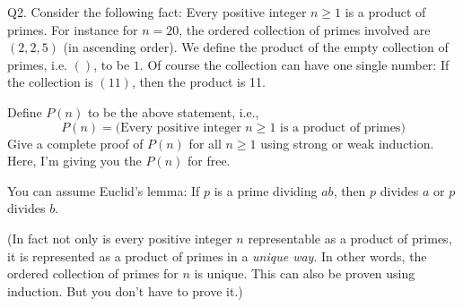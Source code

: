 Q2.
Consider the following fact:
Every positive integer $n \geq 1$ is a product of primes.
For instance for $n = 20$,
the ordered collection of primes involved are $(2, 2, 5)$ (in ascending order).
We define the product of the empty collection of primes, i.e. $()$, to be $1$.
Of course the collection can have one single number:
If the collection is $(11)$, then the product is 11.

Define $P(n)$ to be the above statement, i.e.,
\[
  P(n) =
  \biggl(
  \text{Every positive integer $n \geq 1$ is a product of primes}
  \biggr)
\]
Give a complete proof of $P(n)$ for all $n \geq 1$
using strong or weak induction.
Here, I'm giving you the $P(n)$ for free.

You can assume Euclid's lemma: If $p$ is a prime dividing $ab$,
then $p$ divides $a$ or $p$ divides $b$.

(In fact not only is every positive integer $n$ representable
as a product of primes,
it is represented as a product of primes in a \textit{unique way}.
In other words, the ordered collection of primes for $n$ is unique.
This can also be proven using induction.
But you don't have to prove it.)
